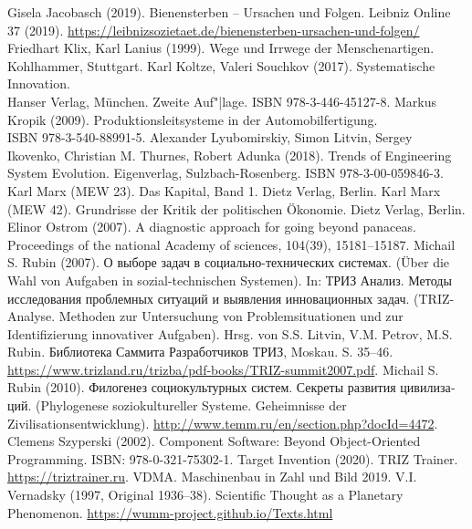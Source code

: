 \documentclass[11pt,a4paper]{article}
\begin{document}
\begin{thebibliography}{xxx}
 Gisela Jacobasch (2019). Bienensterben -- Ursachen und
  Folgen.  Leibniz Online 37 (2019).
  \url{https://leibnizsozietaet.de/bienensterben-ursachen-und-folgen/}
 Friedhart Klix, Karl Lanius (1999). Wege und Irrwege
  der Menschenartigen.  Kohlhammer, Stuttgart.
 Karl Koltze, Valeri Souchkov (2017).
  Systematische Innovation.\\ Hanser Verlag, München. Zweite Auf"|lage. ISBN
  978-3-446-45127-8.
   Markus Kropik (2009). Produktionsleitsysteme in der
    Automobilfertigung.\\ ISBN 978-3-540-88991-5.
 Alexander Lyubomirskiy, Simon Litvin, Sergey Ikovenko,
  Christian M. Thurnes, Robert Adunka (2018). Trends of Engineering System
  Evolution. Eigenverlag, Sulzbach-Rosenberg.  ISBN 978-3-00-059846-3.
 Karl Marx (MEW 23). Das Kapital, Band 1. Dietz Verlag, Berlin.
 Karl Marx (MEW 42). Grundrisse der Kritik der politischen
  Ökonomie.  Dietz Verlag, Berlin.
 Elinor Ostrom (2007). A diagnostic approach for going
  beyond panaceas.  Proceedings of the national Academy of sciences, 104(39),
  15181--15187.
 Michail S. Rubin (2007). \foreignlanguage{russian}{О
  выборе задач в социально-технических системах}. (Über die Wahl von Aufgaben
  in sozial-technischen Systemen). In: \foreignlanguage{russian}{ТРИЗ Анализ.
    Методы исследования проблемных ситуаций и выявления инновационных
    задач}. (TRIZ-Analyse. Methoden zur Untersuchung von Problemsituationen
  und zur Identifizierung innovativer Aufgaben). Hrsg. von S.S. Litvin,
  V.M. Petrov, M.S. Rubin. \foreignlanguage{russian}{Библиотека Саммита
    Разработчиков ТРИЗ}, Moskau. S. 35--46.
  \url{https://www.trizland.ru/trizba/pdf-books/TRIZ-summit2007.pdf}.
 Michail S. Rubin
  (2010). \foreignlanguage{russian}{Филогенез социокультурных систем. Секреты
  развития цивилизаций}.  (Phylogenese soziokultureller Systeme. Geheimnisse
  der Zivilisationsentwicklung).
  \url{http://www.temm.ru/en/section.php?docId=4472}.
 Clemens Szyperski (2002). Component Software: Beyond
  Object-Oriented Programming. ISBN: 978-0-321-75302-1.
 Target Invention (2020). TRIZ Trainer.
  \url{https://triztrainer.ru}.
 VDMA. Maschinenbau in Zahl und Bild 2019. 
 V.I. Vernadsky (1997, Original 1936--38). Scientific
  Thought as a Planetary
  Phenomenon. \url{https://wumm-project.github.io/Texts.html}
\end{thebibliography}
\end{document}
